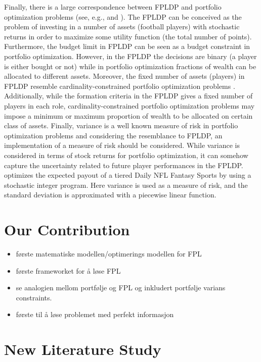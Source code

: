 Finally, there is a large correspondence between FPLDP and portfolio optimization problems (see, e.g., \cite{Markowitz} and \cite{Speranza}). The FPLDP can be conceived as the problem of investing in a number of assets (football players) with stochastic returns in order to maximize some utility function (the total number of points). Furthermore, the budget limit in FPLDP can be seen as a budget constraint in portfolio optimization. However, in the FPLDP the decisions are binary (a player is either bought or not) while in portfolio optimization fractions of wealth can be allocated to different assets. Moreover, the fixed number of assets (players) in FPLDP resemble cardinality-constrained portfolio optimization problems \citep{Chang}. Additionally, while the formation criteria in the FPLDP gives a fixed number of players in each role, cardinality-constrained portfolio optimization problems may impose a minimum or maximum proportion of wealth to be allocated on certain class of assets. Finally, variance is a well known measure of risk in portfolio optimization problems and considering the resemblance to FPLDP, an implementation of a measure of risk should be considered. While variance is considered in terms of stock returns for portfolio optimization, it can somehow capture the uncertainty related to future player performances in the FPLDP. \cite{Dailyfantasysports} optimizes the expected payout of a tiered Daily NFL Fantasy Sports by using a stochastic integer program. Here variance is used as a measure of risk, and the standard deviation is approximated with a piecewise linear function. 

\section{Our Contribution}

\begin{itemize}
    \item første matematiske modellen/optimerings modellen for FPL 
    \item første frameworket for å løse FPL 
    \item se analogien mellom portfølje og FPL og inkludert portfølje varians constraints.
    \item første til å løse problemet med perfekt informasjon 
\end{itemize}




\iffalse %


\section{New Literature Study} \label{new} 

